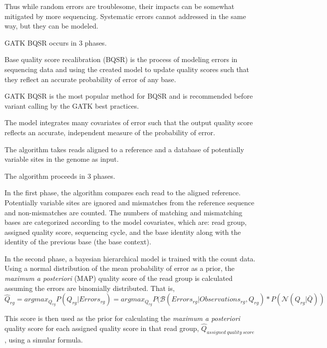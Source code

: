 \documentclass{article}
\begin{document}
\begin{outline}
\begin{outline}
		\item Thus while random errors are troublesome, their impacts can be somewhat mitigated by more sequencing. Systematic errors cannot addressed in the same way, but they can be modeled.
	\end{outline}
	\item GATK BQSR occurs in 3 phases.
	\begin{outline}
		\item Base quality score recalibration (BQSR) is the process of modeling errors in sequencing data and using the created model to update quality scores such that they reflect an accurate probability of error of any base.
		\item GATK BQSR  is the most popular method for BQSR and is recommended before variant calling by the GATK best practices. %
		\item The model integrates many covariates of error such that the output quality score reflects an accurate, independent measure of the probability of error.
		\item The algorithm takes reads aligned to a reference and a database of potentially variable sites in the genome as input.
		\item The algorithm proceeds in 3 phases.
		\item In the first phase, the algorithm compares each read to the aligned reference. Potentially variable sites are ignored and mismatches from the reference sequence and non-mismatches are counted. The numbers of matching and mismatching bases are categorized according to the model covariates, which are: read group, assigned quality score, sequencing cycle, and the base identity along with the identity of the previous base (the base context).
		\item In the second phase, a bayesian hierarchical model is trained with the count data. Using a normal distribution of the mean probability of error as a prior, the \textit{maximum a posteriori} (MAP) quality score of the read group is calculated assuming the errors are binomially distributed. That is,
		\begin{equation}
		\hat{Q}_{rg} = argmax_{Q_{rg}} P(Q_{rg}|Errors_{rg}) = argmax_{Q_{rg}} P(\mathcal{B}(Errors_{rg} | Observations_{rg}, Q_{rg}) * P(\mathcal{N}(Q_{rg} | \bar{Q}))
		\end{equation}
		\item This score is then used as the prior for calculating the \textit{maximum a posteriori} quality score for each assigned quality score in that read group, $\hat{Q}_{assigned\:quality\:score}$, using a simular formula.

\end{outline}
\end{outline}
\end{document}

